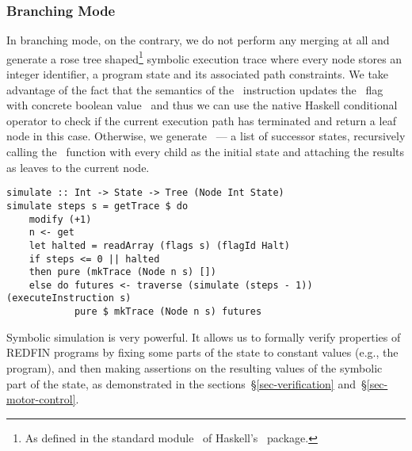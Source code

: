 \subsubsection{Branching Mode}

In branching mode, on the contrary, we do not perform any merging at all and
generate a rose tree shaped\footnote{As defined in the standard
module~ of Haskell's~ package.} symbolic
execution trace where every node stores an integer identifier, a program state
and its associated path constraints. We take advantage of the fact that the
semantics of the~ instruction updates the~ flag with concrete
boolean value~ and thus we can use the native Haskell conditional
operator to check if the current execution path has terminated and return a leaf
node in this case. Otherwise, we generate~ --- a list of successor
states, recursively calling the~ function with every child as the
initial state and attaching the results as leaves to the current node.

\vspace{1mm}
\begin{verbatim}
simulate :: Int -> State -> Tree (Node Int State)
simulate steps s = getTrace $ do
    modify (+1)
    n <- get
    let halted = readArray (flags s) (flagId Halt)
    if steps <= 0 || halted
    then pure (mkTrace (Node n s) [])
    else do futures <- traverse (simulate (steps - 1)) (executeInstruction s)
            pure $ mkTrace (Node n s) futures
\end{verbatim}
\vspace{1mm}

\noindent
Symbolic simulation is very powerful. It allows us to formally verify properties
of REDFIN programs by fixing some parts of the state to constant values (e.g.,
the program), and then making assertions on the resulting values of
the symbolic part of the state, as demonstrated in the
sections~\S\ref{sec-verification} and~\S\ref{sec-motor-control}.

